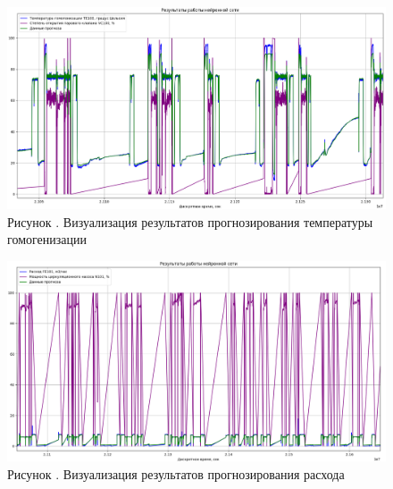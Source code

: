 {  \begin{figure}
    \centering
    \def\svgwidth{\textwidth}
    \includegraphics[width=\textheight]{images/TE100test.png}
    \caption*{\gostFont Рисунок \thechaptercntr .\theimagecntr \spc {--} Визуализация результатов прогнозирования температуры гомогенизации}
    \label{fig:TE100VisualPredict}
  \end{figure} \addtocounter{imagecntr}{1}

  \begin{figure}
    \centering
    \def\svgwidth{\textwidth}
    \includegraphics[width=\textheight]{images/FE101test.png}
    \caption*{\gostFont Рисунок \thechaptercntr .\theimagecntr \spc {--} Визуализация результатов прогнозирования расхода}
    \label{fig:FE101VisualPredict}
  \end{figure} \addtocounter{imagecntr}{1}

}

\setcounter{subchaptercntr}{1}
\setcounter{formulacntr}{1}
\setcounter{imagecntr}{1}
